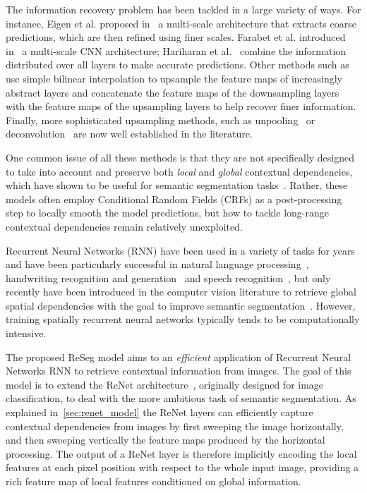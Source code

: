The information recovery problem has been tackled in a large variety of ways.
For instance, Eigen et al. proposed in~\cite{Eigen2015} a multi-scale
architecture that extracts coarse predictions, which are then refined using
finer scales. Farabet et al. introduced in~\cite{Farabet:2013} a multi-scale
CNN architecture; Hariharan et al.~\cite{Hariharan2015} combine the information
distributed over all layers to make accurate predictions. Other methods such
as~\cite{long2014fully,badrinarayanan2015segnet} use simple bilinear
interpolation to upsample the feature maps of increasingly abstract layers and
\cite{Ronneberger2015} concatenate the feature maps of the downsampling layers
with the feature maps of the upsampling layers to help recover finer
information. Finally, more sophisticated upsampling methods, such as
unpooling~\cite{noh2015learning,badrinarayanan2015segnet} or
deconvolution~\cite{long2014fully} are now well established in the literature.

One common issue of all these methods is that they are not specifically
designed to take into account and preserve both \emph{local} and \emph{global}
contextual dependencies, which have shown to be useful for semantic
segmentation tasks~\cite{Singh2013,Gatta14-deepvision}. Rather, these models
often employ Conditional Random Fields (CRFs) as a post-processing step to
locally smooth the model predictions, but how to tackle long-range contextual
dependencies remain relatively unexploited.

Recurrent Neural Networks (RNN) have been used in a variety of tasks for years
and have been particularly successful in natural language
processing~\citep[see, e.g.,][]{Mikolov-thesis-2012,Sutskever-et-al-NIPS2014,
Cho2014}, handwriting recognition and generation~\citep{Graves+Schmidhuber-2009,
Graves-et-al-NIPS2007,Graves-arxiv2013} and speech recognition~\citep{
Chorowski-et-al-arxiv2014,Graves+Jaitly-ICML2014}, but only recently have been
introduced in the computer vision literature to retrieve global spatial
dependencies with the goal to improve semantic
segmentation~\cite{Pinheiro:2014, Gatta14-deepvision, chen2015semantic,
byeon2015scene}. However, training spatially recurrent neural networks
typically tends to be computationally intensive.

The proposed ReSeg model aims to an {\em efficient} application of Recurrent
Neural Networks RNN to retrieve contextual information from images. The goal of
this model is to extend the ReNet architecture~\cite{visin2015renet},
originally designed for image classification, to deal with the more ambitious
task of semantic segmentation. As explained in~\autoref{sec:renet_model} the
ReNet layers can efficiently capture contextual dependencies from images by
first sweeping the image horizontally, and then sweeping vertically the feature
maps produced by the horizontal processing. The output of a ReNet layer is
therefore implicitly encoding the local features at each pixel position with
respect to the whole input image, providing a rich feature map of local
features conditioned on global information.


